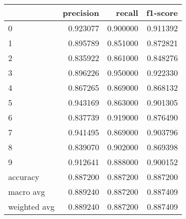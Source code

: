 \begin{tabular}{lrrr}
\toprule
 & precision & recall & f1-score \\
\midrule
0 & 0.923077 & 0.900000 & 0.911392 \\
1 & 0.895789 & 0.851000 & 0.872821 \\
2 & 0.835922 & 0.861000 & 0.848276 \\
3 & 0.896226 & 0.950000 & 0.922330 \\
4 & 0.867265 & 0.869000 & 0.868132 \\
5 & 0.943169 & 0.863000 & 0.901305 \\
6 & 0.837739 & 0.919000 & 0.876490 \\
7 & 0.941495 & 0.869000 & 0.903796 \\
8 & 0.839070 & 0.902000 & 0.869398 \\
9 & 0.912641 & 0.888000 & 0.900152 \\
accuracy & 0.887200 & 0.887200 & 0.887200 \\
macro avg & 0.889240 & 0.887200 & 0.887409 \\
weighted avg & 0.889240 & 0.887200 & 0.887409 \\
\bottomrule
\end{tabular}
